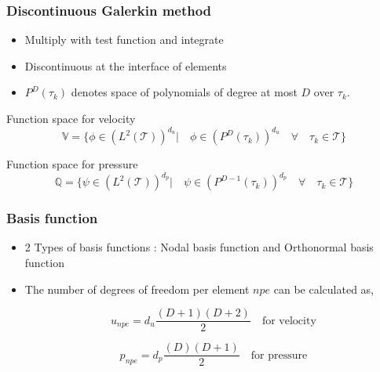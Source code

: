 \documentclass{beamer}
\begin{document}
\begin{frame}
\frametitle{Discontinuous Galerkin method}
\begin{itemize}
\item Multiply with test function and integrate
\item Discontinuous at the interface of elements
\item $P^D(\tau_k)$ denotes space of polynomials of degree at most $D$ over $\tau_k$.
\end{itemize}


\begin{block}{Function space for velocity}
\begin{equation}
\mathbb{V} = \lbrace \phi \in (L^2(\mathcal{T}))^{d_u}| \quad \phi \in (P^D(\tau_k))^{d_u} \quad \forall \quad {\tau_k} \in \mathcal{T} \rbrace
\end{equation}
\end{block}

\begin{block}{Function space for pressure}
\begin{equation}
\mathbb{Q} = \lbrace \psi \in (L^2(\mathcal{T}))^{d_p}| \quad \psi \in (P^{D-1}(\tau_k))^{d_p} \quad \forall \quad {\tau_k} \in \mathcal{T} \rbrace
\end{equation}
\end{block}

\end{frame}

\begin{frame}
\frametitle{Basis function}
\begin{itemize}

\item 2 Types of basis functions : Nodal basis function and Orthonormal basis function

\item The number of degrees of freedom per element $npe$ can be calculated as,

\begin{equation} \label{unpe}
u_{npe} = d_u \frac{(D+1)(D+2)}{2} \quad \textrm{for velocity}
\end{equation} 

\begin{equation} \label{pnpe}
p_{npe} = d_p \frac{(D)(D+1)}{2} \quad \textrm{for pressure}
\end{equation} 

\end{itemize}

\end{frame}
\end{document}
